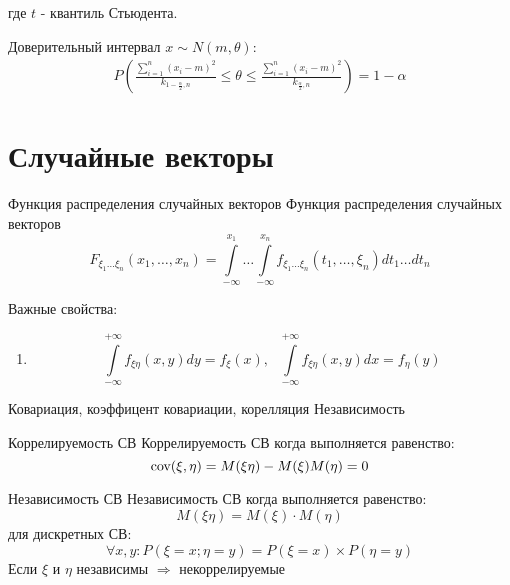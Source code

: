 \documentclass[12pt]{article}
\begin{document}
где $t$ - квантиль Стьюдента.
\par Доверительный интервал $x\sim N(m,\theta)$:
\begin{eqnarray*}
    P\left(
        \frac{\sum\limits_{i=1}^{n}(x_{i}-m)^{2}}{k_{1-\frac{\alpha}{2},n}}
        \leqslant \theta \leqslant
        \frac{\sum\limits_{i=1}^{n}(x_{i}-m)^{2}}{k_{\frac{\alpha}{2},n}}
    \right) = 1 - \alpha
\end{eqnarray*}




\newpage
\section{Случайные векторы}

\begin{definition}
    {Функция распределения случайных векторов}
    {Функция распределения случайных векторов}
    \begin{displaymath}
        F_{\xi_{1}\ldots \xi_{n}}(x_{1},\ldots,x_{n})
        =\int\limits_{-\infty}^{x_{1}}\ldots\int\limits_{-\infty}^{x_{n}}
        f_{\xi_{1}\ldots\xi_{n}}(t_{1},\ldots,\xi_{n})dt_{1}\ldots dt_{n}
    \end{displaymath}
\end{definition}

\par Важные свойства:
\begin{enumerate}
    \item \begin{displaymath}
            \int\limits_{-\infty}^{+\infty}f_{\xi\eta}(x,y)dy=f_{\xi}(x),
            \ \ \ \int\limits_{-\infty}^{+\infty}f_{\xi\eta}(x,y)dx=f_{\eta}(y)
        \end{displaymath}
\end{enumerate}

Ковариация, коэффицент ковариации, корелляция
Независимость

\begin{definition}
    {Коррелируемость СВ}
    {Коррелируемость СВ}
    когда выполняется равенство:
    \begin{displaymath}
        \textmd{cov}(\xi,\eta)=M(\xi\eta)-M(\xi)M(\eta)=0
    \end{displaymath}
\end{definition}

\begin{definition}
    {Независимость СВ}
    {Независимость СВ}
    когда выполняется равенство:
    \begin{displaymath}
        M(\xi\eta)=M(\xi)\cdot M(\eta)
    \end{displaymath}
    для дискретных СВ:
    \begin{displaymath}
        \forall x,y: P(\xi=x;\eta=y)=P(\xi=x)\times P(\eta=y)
    \end{displaymath}
    Если $\xi$ и $\eta$ независимы $ \Rightarrow $ некоррелируемые
\end{definition}
\end{document}
